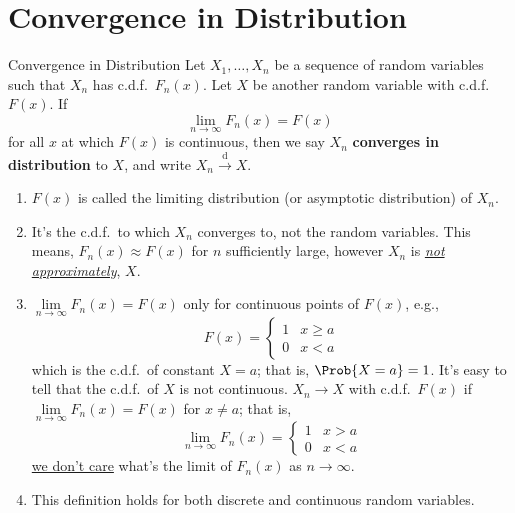 \section{Convergence in Distribution}
\begin{Definition}{Convergence in Distribution}{}
    Let $ X_1,\ldots,X_n $ be a sequence of random variables
    such that $ X_n $ has c.d.f.\ $ F_n(x) $. Let $ X $
    be another random variable with c.d.f.\ $ F(x) $.
    If
    \[ \lim\limits_{{n} \to {\infty}} F_n(x)=F(x) \]
    for all $ x $ at which $ F(x) $ is continuous, then
    we say $ X_n $ \textbf{converges in distribution}
    to $ X $, and write $ X_n\stackrel{\text{d}}{\to} X $.
\end{Definition}
\begin{Remark}{}{}
    \begin{enumerate}[label=(\roman*)]
        \item $ F(x) $ is called the limiting distribution
              (or asymptotic distribution) of $ X_n $.
        \item It's the c.d.f.\ to which $ X_n $ converges to,
              not the random variables. This means,
              $ F_n(x)\approx F(x) $ for $ n $ sufficiently large,
              however $ X_n $ is \underline{\emph{not approximately}},
              $ X $.
        \item $ \lim\limits_{{n} \to {\infty}} F_n(x)=F(x) $
              only for continuous points of $ F(x) $, e.g.,
              \[ F(x)=\begin{cases}
                      1 & x\ge a \\
                      0 & x<a
                  \end{cases} \]
              which is the c.d.f.\
              of constant $ X=a $; that is,
              $ \Prob{X=a}=1 $. It's easy to tell that the
              c.d.f.\ of $ X $ is not continuous.
              $ X_n\to X $ with c.d.f.\ $ F(x) $ if
              $ \lim\limits_{{n} \to {\infty}} F_n(x)=F(x) $
              for $ x\neq a $; that is,
              \[ \lim\limits_{{n} \to {\infty}} F_n(x)=
                  \begin{cases}
                      1 & x>a \\
                      0 & x<a
                  \end{cases} \]
              \underline{we don't care} what's the limit of
              $ F_n(x) $ as $ n\to\infty $.
        \item This definition holds for both discrete and continuous random variables.
    \end{enumerate}
\end{Remark}
